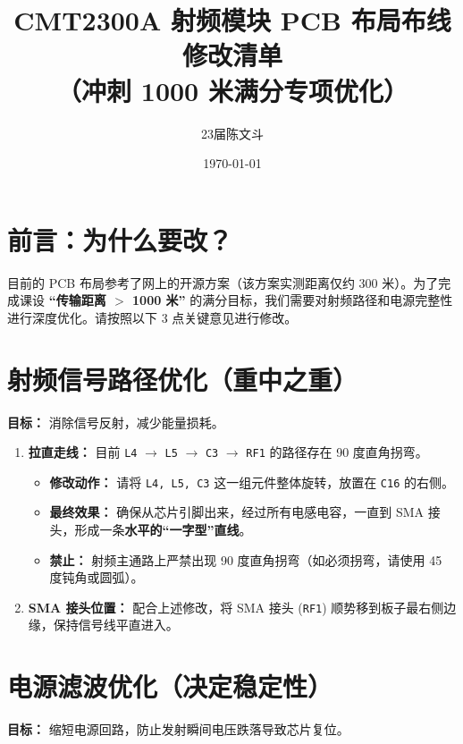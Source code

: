 \documentclass[a4paper,12pt]{article}
\title{\textbf{CMT2300A 射频模块 PCB 布局布线修改清单}\\ \large （冲刺 1000 米满分专项优化）}
\author{23届陈文斗}
\date{\today}
\begin{document}
	\maketitle

	\section*{前言：为什么要改？}
	目前的 PCB 布局参考了网上的开源方案（该方案实测距离仅约 300 米）。为了完成课设 \textbf{“传输距离 $>$ 1000 米”} 的满分目标，我们需要对射频路径和电源完整性进行深度优化。请按照以下 3 点关键意见进行修改。

	\section{射频信号路径优化（重中之重）}
	\textbf{目标：} 消除信号反射，减少能量损耗。

	\begin{enumerate}
		\item \textbf{拉直走线：} 目前 \texttt{L4} $\rightarrow$ \texttt{L5} $\rightarrow$ \texttt{C3} $\rightarrow$ \texttt{RF1} 的路径存在 90 度直角拐弯。
		\begin{itemize}
			\item \textbf{修改动作：} 请将 \texttt{L4, L5, C3} 这一组元件整体旋转，放置在 \texttt{C16} 的右侧。
			\item \textbf{最终效果：} 确保从芯片引脚出来，经过所有电感电容，一直到 SMA 接头，形成一条\textbf{水平的“一字型”直线}。
			\item \textbf{禁止：} 射频主通路上严禁出现 90 度直角拐弯（如必须拐弯，请使用 45 度钝角或圆弧）。
		\end{itemize}
		\item \textbf{SMA 接头位置：} 配合上述修改，将 SMA 接头 (\texttt{RF1}) 顺势移到板子最右侧边缘，保持信号线平直进入。
	\end{enumerate}

	\section{电源滤波优化（决定稳定性）}
	\textbf{目标：} 缩短电源回路，防止发射瞬间电压跌落导致芯片复位。
\end{document}
